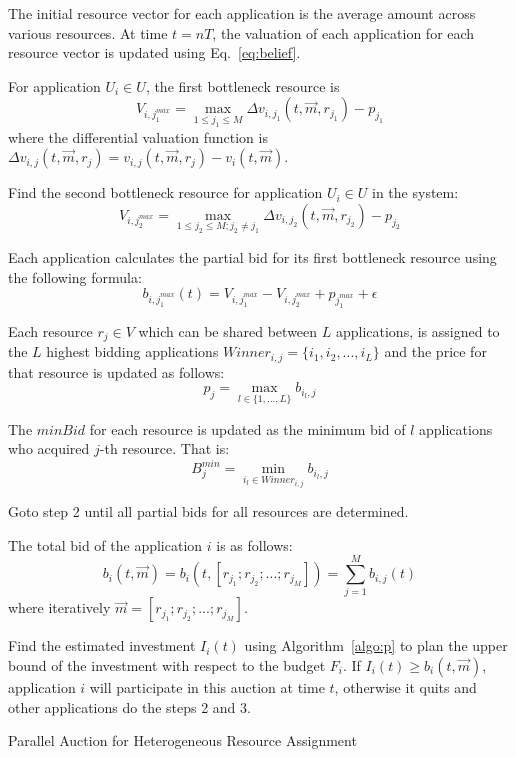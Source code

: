 \begin{algorithm}[!tb] %
\DontPrintSemicolon %
The initial resource vector for each application is the average amount across various resources. At time $t=nT$, the valuation of each application for each resource vector is updated using Eq.~\ref{eq:belief}.

For application $U_i \in U$, the first bottleneck resource is
\[ V_{i,j^{max}_1}=  \max_{1\leq j_1 \leq M} {\Delta v_{i,j_1}(t,\vec{m},r_{j_1})-p_{j_1}}  \] 
where the differential valuation function is $\Delta v_{i,j}(t,\vec{m},r_j) = v_{i,j}(t,\vec{m},r_j) - v_{i}(t,\vec{m})$. 

Find the second bottleneck resource for application $U_i \in U$ in the system:
\[ V_{i,j^{max}_2}=  \max_{1\leq j_2 \leq M; j_2\neq j_1} {\Delta v_{i,j_2}(t,\vec{m},r_{j_2})-p_{j_2}}  \] 

Each application calculates the partial bid for its first bottleneck resource using the following formula:
\[ b_{i,j^{max}_1}(t) = V_{i,j^{max}_1} - V_{i,j^{max}_2} + p_{j^{max}_1} + \epsilon \]

Each resource $r_j \in V$ which can be shared between $L$ applications, is assigned to the $L$ highest bidding applications $Winner_{i,j}=\{i_1, i_2, ..., i_L\}$ and the price for that resource is updated as follows:
\[ p_{j} = \max_{l \in \{1,...,L\}} {b_{i_l,j}}  \]

The $minBid$ for each resource is updated as the minimum bid of $l$ applications who acquired $j$-th resource. That is:
\[ B^{min}_j=  \min_{i_l \in Winner_{i,j}} {b_{i_l,j}} \] 

Goto step 2 until all partial bids for all resources are determined. 

The total bid of the application $i$ is as follows:
\[ b_{i}(t,\vec{m})=b_{i}(t,[r_{j_1};r_{j_2};...;r_{j_M}])=\sum\limits_{j=1}^M {b_{i,j}(t)} \]
where iteratively $\vec{m}=[r_{j_1};r_{j_2};...;r_{j_M}]$.

Find the estimated investment $I_{i}(t)$ using Algorithm~\ref{algo:p} to plan the upper bound of the investment with respect to the budget $F_i$. If $I_{i}(t)\geq b_{i}(t,\vec{m})$, application $i$ will participate in this auction at time $t$, otherwise it quits and other applications do the steps 2 and 3.

\caption{Parallel Auction for Heterogeneous Resource Assignment}
\label{algo:b}
\end{algorithm}
